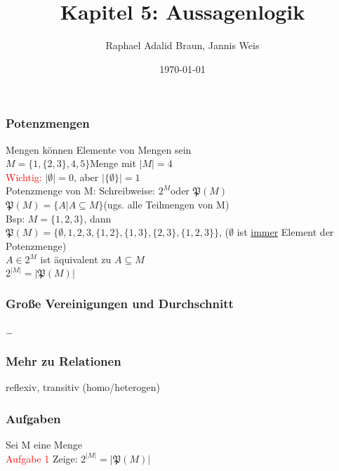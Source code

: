 \documentclass{beamer}
\title{Kapitel 5: Aussagenlogik}
\author{Raphael Adalid Braun, Jannis Weis}
\date{\today}
\institute{KIT - Karlruher Institut für Technologie}
\begin{document}
	\begin{frame}
		\frametitle{Potenzmengen}
		Mengen können Elemente von Mengen sein\\
		$M = \{1, \{2, 3\}, 4, 5\} $Menge mit $\lvert M\rvert = 4$\\
		\textcolor{red}{Wichtig:} $\lvert \emptyset\rvert = 0$, aber $\lvert\{\emptyset\}\rvert = 1$\\
		Potenzmenge von M: Schreibweise: $2^M $oder $\mathfrak{P}(M)$\\
		$\mathfrak{P}(M) = \{ A\vert A\subseteq M\}$(ugs. alle Teilmengen von M)\\
		Bsp: $M = \{1, 2, 3\}$, dann\\
		$\mathfrak{P}(M) =\{\emptyset ,1, 2, 3, \{1, 2\}, \{1, 3\}, \{2, 3\}, \{1,2,3\}\}$, ($\emptyset$ ist \underline{immer} Element der Potenzmenge)\\
		$A\in 2^M$ ist äquivalent zu $A\subseteq M$\\
		$2^{\lvert M\rvert} = \lvert\mathfrak{P}(M)\rvert$
	\end{frame}
	\begin{frame}
		\frametitle{Große Vereinigungen und Durchschnitt}
		\dots%
	\end{frame}
	\begin{frame}
		\frametitle{Mehr zu Relationen}
		reflexiv, transitiv (homo/heterogen)
	\end{frame}
	\begin{frame}
		\frametitle{Aufgaben}
		Sei M eine Menge\\
		\textcolor{red}{Aufgabe 1} Zeige: $2^{\lvert M\rvert} = \lvert\mathfrak{P}(M)\rvert$\\
	\end{frame}
\end{document}

